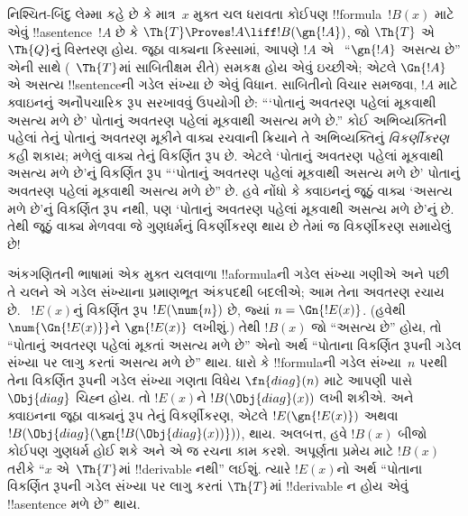 \documentclass[../../../include/open-logic-section]{subfiles}
\begin{document}


\begin{explain}
નિશ્ચિત-બિંદુ લેમ્મા કહે છે કે
માત્ર~$x$ મુક્ત ચલ ધરાવતા કોઈપણ !!{formula}~$!B(x)$ માટે
એવું !!a{sentence}~$!A$ છે કે
$\Th{T} \Proves !A \liff !B(\gn{!A})$,
જો $\Th{T}$ એ~$\Th{Q}$નું
વિસ્તરણ હોય. જૂઠા વાક્યના
કિસ્સામાં, આપણે $!A$ એ
~``$\gn{!A}$ અસત્ય છે''
એની સાથે (~$\Th{T}$માં
સાબિતીક્ષમ રીતે) સમકક્ષ
હોય એવું ઇચ્છીએ; એટલે
$\Gn{!A}$ એ અસત્ય
!!{sentence}ની ગડેલ સંખ્યા
છે એવું વિધાન.
સાબિતીનો વિચાર સમજવા,
$!A$ માટે ક્વાઇનનું
અનૌપચારિક રૂપ સરખાવવું
ઉપયોગી છે: ``{}`પોતાનું
અવતરણ પહેલાં મૂકવાથી
અસત્ય મળે છે' પોતાનું
અવતરણ પહેલાં મૂકવાથી
અસત્ય મળે છે.'' કોઈ
અભિવ્યક્તિની પહેલાં તેનું
પોતાનું અવતરણ મૂકીને
વાક્ય રચવાની ક્રિયાને તે
અભિવ્યક્તિનું
\emph{વિકર્ણીકરણ} કહી શકાય;
મળેલું વાક્ય તેનું
વિકર્ણિત રૂપ છે.
એટલે `પોતાનું અવતરણ
પહેલાં મૂકવાથી અસત્ય મળે
છે'નું વિકર્ણિત રૂપ
``{}`પોતાનું અવતરણ પહેલાં
મૂકવાથી અસત્ય મળે છે'
પોતાનું અવતરણ પહેલાં
મૂકવાથી અસત્ય મળે છે'' છે.
હવે નોંધો કે ક્વાઇનનું
જૂઠું વાક્ય `અસત્ય મળે છે'નું
વિકર્ણિત રૂપ નથી, પણ
`પોતાનું અવતરણ પહેલાં
મૂકવાથી અસત્ય મળે છે'નું
છે. તેથી જૂઠું વાક્ય
મેળવવા જે ગુણધર્મનું
વિકર્ણીકરણ થાય છે તેમાં
જ વિકર્ણીકરણ સમાયેલું છે!{}

અંકગણિતની ભાષામાં એક
મુક્ત ચલવાળા !!a{formula}ની
ગડેલ સંખ્યા ગણીએ અને
પછી તે ચલને એ ગડેલ
સંખ્યાના પ્રમાણભૂત અંકપદથી
બદલીએ; આમ તેના અવતરણ
રચાય છે.
~$!E(x)$નું વિકર્ણિત
રૂપ $!E(\num{n})$ છે,
જ્યાં $n = \Gn{!E(x)}$.
(હવેથી $\num{\Gn{!E(x)}}$ને
$\gn{!E(x)}$ લખીશું.)
તેથી $!B(x)$ જો
``અસત્ય છે'' હોય,
તો ``પોતાનું અવતરણ પહેલાં
મૂકતાં અસત્ય મળે છે''
એનો અર્થ ``પોતાના
વિકર્ણિત રૂપની ગડેલ
સંખ્યા પર લાગુ કરતાં
અસત્ય મળે છે'' થાય.
ધારો કે !!{formula}ની
ગડેલ સંખ્યા~$n$ પરથી
તેના વિકર્ણિત રૂપની
ગડેલ સંખ્યા ગણતા વિધેય
$\fn{diag}(n)$ માટે
આપણી પાસે
~$\Obj{diag}$ ચિહ્ન હોય.
તો $!E(x)$ને
$!B(\Obj{diag}(x))$
લખી શકીએ. અને ક્વાઇનના
જૂઠા વાક્યનું રૂપ તેનું
વિકર્ણીકરણ, એટલે
$!E(\gn{!E(x)})$ અથવા
$!B(\Obj{diag}(\gn{!B(\Obj{diag}(x))}))$,
થાય. અલબત્ત, હવે
$!B(x)$ બીજો કોઈપણ
ગુણધર્મ હોઈ શકે અને એ
જ રચના કામ કરશે.
અપૂર્ણતા પ્રમેય માટે
$!B(x)$ તરીકે
``$x$ એ~$\Th{T}$માં
!!{derivable} નથી'' લઈશું.
ત્યારે $!E(x)$નો અર્થ
``પોતાના વિકર્ણિત રૂપની
ગડેલ સંખ્યા પર લાગુ
કરતાં $\Th{T}$માં
!!{derivable} ન હોય એવું
!!a{sentence} મળે છે''
થાય.


\end{explain}
\end{document}
